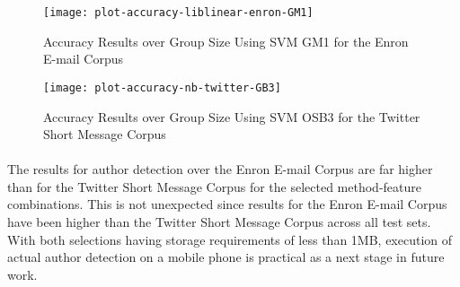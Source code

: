 \begin{figure}[htbp!]
	\begin{center}
	\centering
	\texttt{[image: plot-accuracy-liblinear-enron-GM1]}
	\caption{Accuracy Results over Group Size Using SVM GM1 for the Enron E-mail Corpus}
	\label{fig:accuracy-liblinear-enron-GM1-over-groups}
	\end{center}
\end{figure}

\begin{figure}[htbp!]
	\begin{center}
	\centering
	\texttt{[image: plot-accuracy-nb-twitter-GB3]}
	\caption{Accuracy Results over Group Size Using SVM OSB3 for the Twitter Short Message Corpus}
	\label{fig:accuracy-liblinear-twitter-OSB3-over-groups}
	\end{center}
\end{figure}

\paragraph*{} The results for author detection over the Enron E-mail Corpus are far higher than for the Twitter Short Message Corpus for the selected method-feature combinations.  This is not unexpected since results for the Enron E-mail Corpus have been higher than the Twitter Short Message Corpus across all test sets.  With both selections having storage requirements of less than 1MB, execution of actual author detection on a mobile phone is practical as a next stage in future work.
